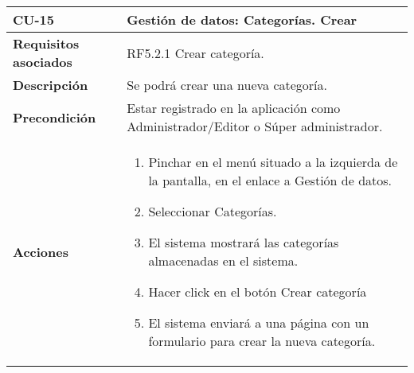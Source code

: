 \newpage
\begin{longtable}[H]{@{}ll@{}}
\toprule
\begin{minipage}[b]{0.23\columnwidth}\raggedright\strut
\textbf{CU-15}\strut
\end{minipage} & \begin{minipage}[b]{0.71\columnwidth}\raggedright\strut
\textbf{Gestión de datos: Categorías. Crear}\strut
\end{minipage}\tabularnewline
\midrule
\endhead
\begin{minipage}[t]{0.23\columnwidth}\raggedright\strut
\textbf{Requisitos asociados}\strut
\end{minipage} & \begin{minipage}[t]{0.71\columnwidth}\raggedright\strut
RF5.2.1 Crear categoría.\strut
\end{minipage}\tabularnewline
\begin{minipage}[t]{0.23\columnwidth}\raggedright\strut
\textbf{Descripción}\strut
\end{minipage} & \begin{minipage}[t]{0.71\columnwidth}\raggedright\strut
Se podrá crear una nueva categoría.
\strut
\end{minipage}\tabularnewline
\begin{minipage}[t]{0.23\columnwidth}\raggedright\strut
\textbf{Precondición}\strut
\end{minipage} & \begin{minipage}[t]{0.71\columnwidth}\raggedright\strut
Estar registrado en la aplicación como Administrador/Editor o Súper administrador.\strut
\end{minipage}\tabularnewline
\begin{minipage}[t]{0.23\columnwidth}\raggedright\strut
\textbf{Acciones}\strut
\end{minipage} & \begin{minipage}[t]{0.71\columnwidth}\raggedright\strut
\begin{enumerate}
\def\labelenumi{\arabic{enumi}.}
\tightlist
\item
Pinchar en el menú situado a la izquierda de la pantalla, en el
enlace a Gestión de datos.
\item
Seleccionar Categorías.
\item
El sistema mostrará las categorías almacenadas en el sistema.
\item
Hacer click en el botón Crear categoría
\item
El sistema enviará a una página con un formulario para crear la
nueva categoría.

\end{enumerate}
\end{minipage}
\end{longtable}
